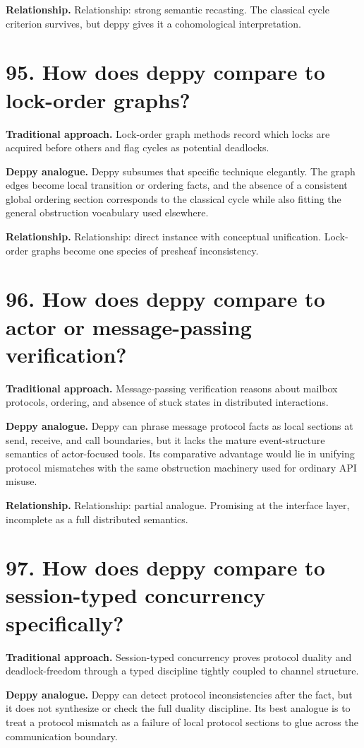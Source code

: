\documentclass[11pt,openany]{book}
\begin{document}
\textbf{Relationship.} Relationship: strong semantic recasting. The classical cycle criterion survives, but deppy gives it a cohomological interpretation.

\section*{95. How does deppy compare to lock-order graphs?}
\textbf{Traditional approach.} Lock-order graph methods record which locks are acquired before others and flag cycles as potential deadlocks.

\textbf{Deppy analogue.} Deppy subsumes that specific technique elegantly. The graph edges become local transition or ordering facts, and the absence of a consistent global ordering section corresponds to the classical cycle while also fitting the general obstruction vocabulary used elsewhere.

\textbf{Relationship.} Relationship: direct instance with conceptual unification. Lock-order graphs become one species of presheaf inconsistency.

\section*{96. How does deppy compare to actor or message-passing verification?}
\textbf{Traditional approach.} Message-passing verification reasons about mailbox protocols, ordering, and absence of stuck states in distributed interactions.

\textbf{Deppy analogue.} Deppy can phrase message protocol facts as local sections at send, receive, and call boundaries, but it lacks the mature event-structure semantics of actor-focused tools. Its comparative advantage would lie in unifying protocol mismatches with the same obstruction machinery used for ordinary API misuse.

\textbf{Relationship.} Relationship: partial analogue. Promising at the interface layer, incomplete as a full distributed semantics.

\section*{97. How does deppy compare to session-typed concurrency specifically?}
\textbf{Traditional approach.} Session-typed concurrency proves protocol duality and deadlock-freedom through a typed discipline tightly coupled to channel structure.

\textbf{Deppy analogue.} Deppy can detect protocol inconsistencies after the fact, but it does not synthesize or check the full duality discipline. Its best analogue is to treat a protocol mismatch as a failure of local protocol sections to glue across the communication boundary.
\end{document}
